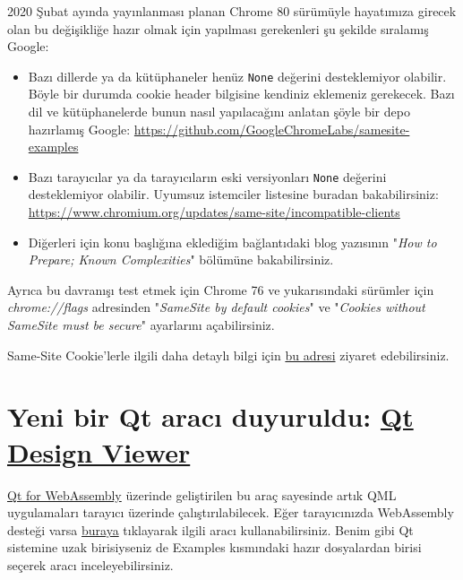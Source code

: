 \documentclass[11pt]{article}
\begin{document}
2020 Şubat ayında yayınlanması planan Chrome 80 sürümüyle hayatımıza girecek
olan bu değişikliğe hazır olmak için yapılması gerekenleri şu şekilde sıralamış
Google:
\begin{itemize}
\item Bazı dillerde ya da kütüphaneler henüz \texttt{None} değerini desteklemiyor
olabilir. Böyle bir durumda cookie header bilgisine kendiniz eklemeniz
gerekecek. Bazı dil ve kütüphanelerde bunun nasıl yapılacağını anlatan
şöyle bir depo hazırlamış Google:
\url{https://github.com/GoogleChromeLabs/samesite-examples}
\item Bazı tarayıcılar ya da tarayıcıların eski versiyonları \texttt{None} değerini
desteklemiyor olabilir. Uyumsuz istemciler listesine buradan
bakabilirsiniz:
\url{https://www.chromium.org/updates/same-site/incompatible-clients}
\item Diğerleri için konu başlığına eklediğim bağlantıdaki blog yazısının "\emph{How
to Prepare; Known Complexities}" bölümüne bakabilirsiniz.
\end{itemize}

Ayrıca bu davranışı test etmek için Chrome 76 ve yukarısındaki sürümler için
\emph{chrome://flags} adresinden "\emph{SameSite by default cookies}" ve "\emph{Cookies
without SameSite must be secure}" ayarlarını açabilirsiniz.

Same-Site Cookie'lerle ilgili daha detaylı bilgi için \href{https://web.dev/samesite-cookies-explained/}{bu adresi} ziyaret
edebilirsiniz.
\section{Yeni bir Qt aracı duyuruldu: \href{https://www.qt.io/blog/web-based-qt-design-viewer}{Qt Design Viewer}}
\label{sec:orga942fd3}
\href{https://doc.qt.io/qt-5/wasm.html}{Qt for WebAssembly} üzerinde geliştirilen bu araç sayesinde artık QML
uygulamaları tarayıcı üzerinde çalıştırılabilecek. Eğer tarayıcınızda
WebAssembly desteği varsa \href{http://qt-webassembly.io/designviewer/}{buraya} tıklayarak ilgili aracı kullanabilirsiniz.
Benim gibi Qt sistemine uzak birisiyseniz de Examples kısmındaki hazır
dosyalardan birisi seçerek aracı inceleyebilirsiniz.
\end{document}
